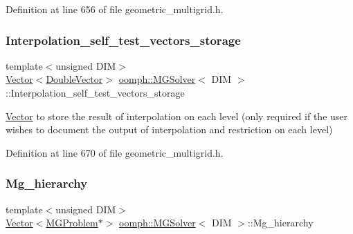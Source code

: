 Definition at line 656 of file geometric\+\_\+multigrid.\+h.

\mbox{\label{classoomph_1_1MGSolver_ab751da487614e6f661b8d944f37c20ec}} 
\subsubsection{\texorpdfstring{Interpolation\+\_\+self\+\_\+test\+\_\+vectors\+\_\+storage}{Interpolation\_self\_test\_vectors\_storage}}
{\footnotesize\ttfamily template$<$unsigned D\+IM$>$ \\
\hyperlink{classoomph_1_1Vector}{Vector}$<$\hyperlink{classoomph_1_1DoubleVector}{Double\+Vector}$>$ \hyperlink{classoomph_1_1MGSolver}{oomph\+::\+M\+G\+Solver}$<$ D\+IM $>$\+::Interpolation\+\_\+self\+\_\+test\+\_\+vectors\+\_\+storage\hspace{0.3cm}{\ttfamily [private]}}



\hyperlink{classoomph_1_1Vector}{Vector} to store the result of interpolation on each level (only required if the user wishes to document the output of interpolation and restriction on each level) 



Definition at line 670 of file geometric\+\_\+multigrid.\+h.

\mbox{\label{classoomph_1_1MGSolver_ab6a410abeb049aec45409a5cf74597f6}} 
\subsubsection{\texorpdfstring{Mg\+\_\+hierarchy}{Mg\_hierarchy}}
{\footnotesize\ttfamily template$<$unsigned D\+IM$>$ \\
\hyperlink{classoomph_1_1Vector}{Vector}$<$\hyperlink{classoomph_1_1MGProblem}{M\+G\+Problem}$\ast$$>$ \hyperlink{classoomph_1_1MGSolver}{oomph\+::\+M\+G\+Solver}$<$ D\+IM $>$\+::Mg\+\_\+hierarchy\hspace{0.3cm}{\ttfamily [private]}}



